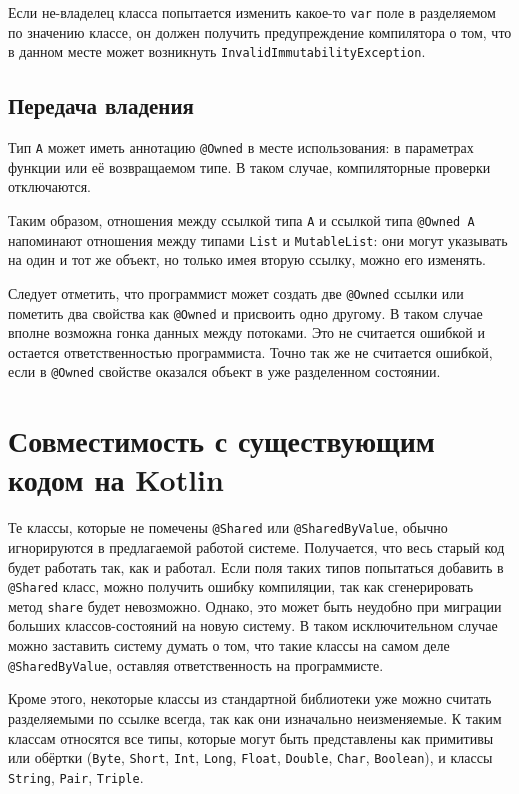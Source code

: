 \documentclass[specification,annotation,times]{itmo-student-thesis}
\begin{document}
Если не-владелец класса попытается изменить какое-то \texttt{var} поле в разделяемом по значению классе, он должен получить предупреждение компилятора о том, что в данном месте может возникнуть \texttt{InvalidImmutabilityException}.

\subsection{Передача владения}

Тип \texttt{А} может иметь аннотацию \texttt{@Owned} в месте использования: в параметрах функции или её возвращаемом типе. В таком случае, компиляторные проверки отключаются.

Таким образом, отношения между ссылкой типа \texttt{А} и ссылкой типа \texttt{@Owned A} напоминают отношения между типами \texttt{List} и \texttt{MutableList}: они могут указывать на один и тот же объект, но только имея вторую ссылку, можно его изменять.

Следует отметить, что программист может создать две \texttt{@Owned} ссылки или пометить два свойства как \texttt{@Owned} и присвоить одно другому. В таком случае вполне возможна гонка данных между потоками. Это не считается ошибкой и остается ответственностью программиста.
Точно так же не считается ошибкой, если в \texttt{@Owned} свойстве оказался объект в уже разделенном состоянии.

\section{Совместимость с существующим кодом на Kotlin}\label{backwards_compat}

Те классы, которые не помечены \texttt{@Shared} или \texttt{@SharedByValue}, обычно игнорируются в предлагаемой работой системе.
Получается, что весь старый код будет работать так, как и работал.
Если поля таких типов попытаться добавить в \texttt{@Shared} класс, можно получить ошибку компиляции, так как сгенерировать метод \texttt{share} будет невозможно.
Однако, это может быть неудобно при миграции больших классов-состояний на новую систему.
В таком исключительном случае можно заставить систему думать о том, что такие классы на самом деле \texttt{@SharedByValue}, оставляя ответственность на программисте.

Кроме этого, некоторые классы из стандартной библиотеки уже можно считать разделяемыми по ссылке всегда, так как они изначально неизменяемые.
К таким классам относятся все типы, которые могут быть представлены как примитивы или обёртки (\texttt{Byte}, \texttt{Short}, \texttt{Int}, \texttt{Long}, \texttt{Float}, \texttt{Double}, \texttt{Char}, \texttt{Boolean}), и классы \texttt{String}, \texttt{Pair}, \texttt{Triple}.
\chapterconclusion
\end{document}
